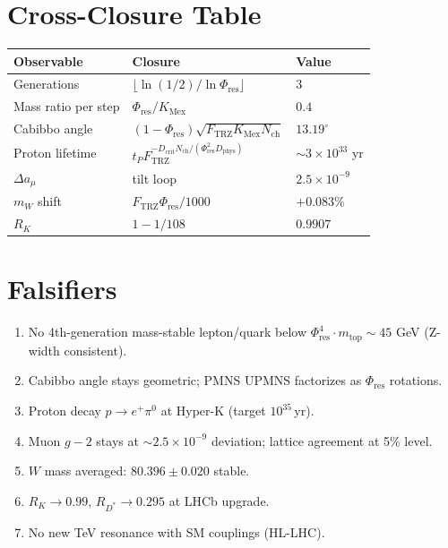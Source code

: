 \documentclass[11pt]{article}
\newcommand{\Ftrz}{F_{\mathrm{TRZ}}}
\newcommand{\Phires}{\Phi_{\mathrm{res}}}
\newcommand{\KMex}{K_{\mathrm{Mex}}}
\newcommand{\Dphys}{D_{\mathrm{phys}}}
\newcommand{\Dcrit}{D_{\mathrm{crit}}}
\newcommand{\Nch}{N_{\mathrm{ch}}}
\begin{document}
\section{Cross-Closure Table}
\begin{table}[h!]
\centering
\begin{tabular}{lll}
\toprule
Observable & Closure & Value \\
\midrule
Generations              & $\lfloor\ln(1/2)/\ln\Phires\rfloor$ & $3$ \\
Mass ratio per step      & $\Phires/\KMex$         & $0.4$ \\
Cabibbo angle            & $(1-\Phires)\sqrt{\Ftrz\KMex\Nch}$  & $13.19^\circ$ \\
Proton lifetime          & $t_P\Ftrz^{-\Dcrit\Nch/(\Phires^{2}\Dphys)}$        & $\sim 3\times10^{33}$ yr \\
$\Delta a_\mu$           & tilt loop               & $2.5\times10^{-9}$ \\
$m_W$ shift              & $\Ftrz\Phires/1000$     & $+0.083$\% \\
$R_K$                    & $1-1/108$               & $0.9907$ \\
\bottomrule
\end{tabular}
\end{table}

\section{Falsifiers}
\begin{enumerate}[label=(F\arabic*)]
\item No 4th-generation mass-stable lepton/quark below $\Phires^4\cdot m_{\text{top}}\sim45$ GeV (Z-width consistent).
\item Cabibbo angle stays geometric; PMNS UPMNS factorizes as $\Phires$ rotations.
\item Proton decay $p\to e^+\pi^0$ at Hyper-K (target $10^{35}$\,yr).
\item Muon $g-2$ stays at $\sim2.5\times10^{-9}$ deviation; lattice agreement at 5\% level.
\item $W$ mass averaged: $80.396\pm0.020$ stable.
\item $R_K\to0.99$, $R_{D^*}\to0.295$ at LHCb upgrade.
\item No new TeV resonance with SM couplings (HL-LHC).
\end{enumerate}
\end{document}
